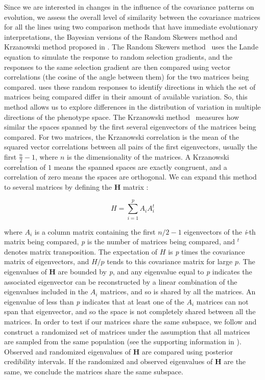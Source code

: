 \begin{refsection}
Since we are interested in changes in the influence of the covariance patterns
on evolution, we assess the overall level of similarity between the covariance
matrices for all the lines using two comparison methods that have immediate
evolutionary interpretations, the Bayesian versions of the Random Skewers
method and Krzanowski method proposed in \textcite{Aguirre2013-lp}. The Random
Skewers method~\parencite{Cheverud2007-yp} uses the Lande equation to simulate
the response to random selection gradients, and the responses to the same
selection gradient are then compared using vector correlations (the cosine of
the angle between them) for the two matrices being compared.
\textcite{Aguirre2013-lp} uses these random responses to identify directions
in which the set of matrices being compared differ in their amount of
available variation. So, this method allows us to explore differences in the
distribution of variation in multiple directions of the phenotype space. The
Krzanowski method~\parencite{Krzanowski1979-gj} measures how similar the
spaces spanned by the first several eigenvectors of the matrices being
compared. For two  matrices, the Krzanowski correlation is the mean of the
squared vector correlations between all pairs of the first eigenvectors,
usually the first \(\frac{n}{2} - 1\), where \(n\) is the dimensionality of
the matrices. A Krzanowski correlation of \(1\) means the spanned spaces are
exactly congruent, and a correlation of zero means the spaces are orthogonal.
We can expand this method to several matrices by defining the \textbf{H}
matrix \parencite{Krzanowski1979-gj}:

\[
H = \sum_{i=1}^p A_iA_i^t
\]

where \(A_i\) is a column matrix containing the first \(n/2 - 1\)
eigenvectors of the \emph{i}-th matrix being compared, \emph{p} is the
number of matrices being compared, and \(^t\) denotes matrix
transposition. The expectation of \(H\) is \emph{p} times the covariance
matrix of eigenvectors, and \(H/p\) tends to this covariance matrix for
large \(p\). The eigenvalues of \textbf{H} are bounded by \emph{p}, and
any eigenvalue equal to \emph{p} indicates the associated eigenvector
can be reconstructed by a linear combination of the eigenvalues included
in the \(A_i\) matrices, and so is shared by all the matrices. An
eigenvalue of less than \emph{p} indicates that at least one of the
\(A_i\) matrices can not span that eigenvector, and so the space is not
completely shared between all the matrices. In order to test if our
matrices share the same subspace, we follow \textcite{Aguirre2013-lp} and construct a
randomized set of matrices under the assumption that all matrices are
sampled from the same population (see the supporting information in
\textcite{Aguirre2013-lp}). Observed and randomized eigenvalues of \textbf{H} are
compared using posterior credibility intervals. If the randomized and
observed eigenvalues of \textbf{H} are the same, we conclude the
matrices share the same subspace.


\end{refsection}
